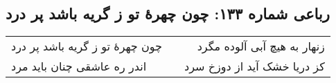 \begin{center}
\section*{رباعی شماره ۱۳۳: چون چهرهٔ تو ز گریه باشد پر درد}
\label{sec:sh133}
\begin{longtable}{l p{0.5cm} r}
چون چهرهٔ تو ز گریه باشد پر درد
&&
زنهار به هیچ آبی آلوده مگرد
\\
اندر ره عاشقی چنان باید مرد
&&
کز دریا خشک آید از دوزخ سرد
\\
\end{longtable}
\end{center}
